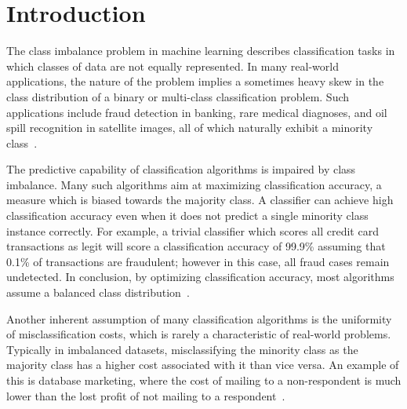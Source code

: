 \documentclass[sort&compress]{elsarticle}
\begin{document}

\section{Introduction}
The class imbalance problem in machine learning describes classification tasks in which classes of data are not equally represented. In many real-world applications, the nature of the problem implies a sometimes heavy skew in the class distribution of a binary or multi-class classification problem. Such applications include fraud detection in banking, rare medical diagnoses, and oil spill recognition in satellite images, all of which naturally exhibit a minority class~\citep{Chawla.2002,Kotsiantis.2006,Kotsiantis.2007,Galar.2012}.

The predictive capability of classification algorithms is impaired by class imbalance. Many such algorithms aim at maximizing classification accuracy, a measure which is biased towards the majority class. A classifier can achieve high classification accuracy even when it does not predict a single minority class instance correctly. For example, a trivial classifier which scores all credit card transactions as legit will score a classification accuracy of 99.9\% assuming that 0.1\% of transactions are fraudulent; however in this case, all fraud cases remain undetected. In conclusion, by optimizing classification accuracy, most algorithms assume a balanced class distribution~\citep{Provost.2000,Kotsiantis.2007}.

Another inherent assumption of many classification algorithms is the uniformity of misclassification costs, which is rarely a characteristic of real-world problems. Typically in imbalanced datasets, misclassifying the minority class as the majority class has a higher cost associated with it than vice versa. An example of this is database marketing, where the cost of mailing to a non-respondent is much lower than the lost profit of not mailing to a respondent~\citep{Domingos.1999}.
\end{document}
